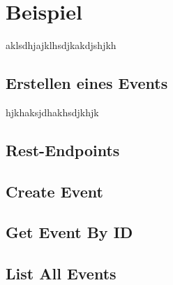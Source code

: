 \section{Beispiel}
aklsdhjajklhsdjkakdjshjkh

\begin{spacing}{1}
\subsection{Erstellen eines Events}
\end{spacing}
hjkhaksjdhakhsdjkhjk

\begin{spacing}{1}
\section{Rest-Endpoints}
\end{spacing}

\begin{spacing}{1}
\subsection{Create Event}
\end{spacing}

\begin{spacing}{1}
\subsection{Get Event By ID}
\end{spacing}
    
\begin{spacing}{1}
\subsection{List All Events}
\end{spacing}
    